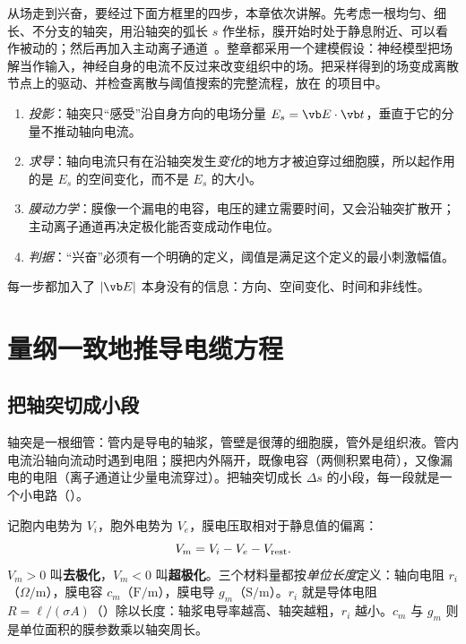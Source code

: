 从场走到兴奋，要经过下面方框里的四步，本章依次讲解。先考虑一根均匀、细长、不分支的轴突，用沿轴突的弧长 $s$ 作坐标，膜开始时处于静息附近、可以看作被动的；然后再加入主动离子通道~\cite{rattay,davids}。整章都采用一个建模假设：神经模型把场解当作输入，神经自身的电流不反过来改变组织中的场。把采样得到的场变成离散节点上的驱动、并检查离散与阈值搜索的完整流程，放在 的项目中。

\begin{intuition}[从场到兴奋的四步]
\begin{enumerate}
\item \emph{投影}：轴突只“感受”沿自身方向的电场分量 $E_s=\vb E\cdot\vb t$，垂直于它的分量不推动轴向电流。
\item \emph{求导}：轴向电流只有在沿轴突发生\emph{变化}的地方才被迫穿过细胞膜，所以起作用的是 $E_s$ 的空间变化，而不是 $E_s$ 的大小。
\item \emph{膜动力学}：膜像一个漏电的电容，电压的建立需要时间，又会沿轴突扩散开；主动离子通道再决定极化能否变成动作电位。
\item \emph{判据}：“兴奋”必须有一个明确的定义，阈值是满足这个定义的最小刺激幅值。
\end{enumerate}
每一步都加入了 $|\vb E|$ 本身没有的信息：方向、空间变化、时间和非线性。
\end{intuition}

\section{量纲一致地推导电缆方程}\label{sec:neuro-cable}

\subsection{把轴突切成小段}
轴突是一根细管：管内是导电的轴浆，管壁是很薄的细胞膜，管外是组织液。管内电流沿轴向流动时遇到电阻；膜把内外隔开，既像电容（两侧积累电荷），又像漏电的电阻（离子通道让少量电流穿过）。把轴突切成长 $\Delta s$ 的小段，每一段就是一个小电路（）。


记胞内电势为 $V_i$，胞外电势为 $V_e$，膜电压取相对于静息值的偏离：
\begin{equation}
V_m=V_i-V_e-V_{\rm rest}.
\end{equation}
$V_m>0$ 叫\textbf{去极化}，$V_m<0$ 叫\textbf{超极化}。三个材料量都按\emph{单位长度}定义：轴向电阻 $r_i$（$\Omega/\mathrm m$），膜电容 $c_m$（$\mathrm{F/m}$），膜电导 $g_m$（$\mathrm{S/m}$）。$r_i$ 就是导体电阻 $R=\ell/(\sigma A)$（）除以长度：轴浆电导率越高、轴突越粗，$r_i$ 越小。$c_m$ 与 $g_m$ 则是单位面积的膜参数乘以轴突周长。

